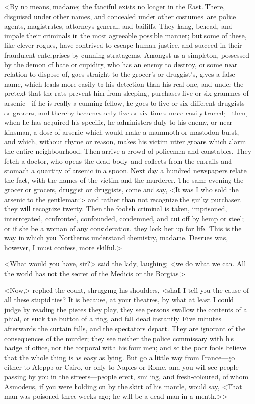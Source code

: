  <By no means, madame; the fanciful exists no longer in the East. There, disguised under other names, and concealed under other costumes, are police agents, magistrates, attorneys-general, and bailiffs. They hang, behead, and impale their criminals in the most agreeable possible manner; but some of these, like clever rogues, have contrived to escape human justice, and succeed in their fraudulent enterprises by cunning stratagems. Amongst us a simpleton, possessed by the demon of hate or cupidity, who has an enemy to destroy, or some near relation to dispose of, goes straight to the grocer's or druggist's, gives a false name, which leads more easily to his detection than his real one, and under the pretext that the rats prevent him from sleeping, purchases five or six grammes of arsenic—if he is really a cunning fellow, he goes to five or six different druggists or grocers, and thereby becomes only five or six times more easily traced;—then, when he has acquired his specific, he administers duly to his enemy, or near kinsman, a dose of arsenic which would make a mammoth or mastodon burst, and which, without rhyme or reason, makes his victim utter groans which alarm the entire neighbourhood. Then arrive a crowd of policemen and constables. They fetch a doctor, who opens the dead body, and collects from the entrails and stomach a quantity of arsenic in a spoon. Next day a hundred newspapers relate the fact, with the names of the victim and the murderer. The same evening the grocer or grocers, druggist or druggists, come and say, <It was I who sold the arsenic to the gentleman;> and rather than not recognize the guilty purchaser, they will recognize twenty. Then the foolish criminal is taken, imprisoned, interrogated, confronted, confounded, condemned, and cut off by hemp or steel; or if she be a woman of any consideration, they lock her up for life. This is the way in which you Northerns understand chemistry, madame. Desrues was, however, I must confess, more skilful.> 

 <What would you have, sir?> said the lady, laughing; <we do what we can. All the world has not the secret of the Medicis or the Borgias.> 

 <Now,> replied the count, shrugging his shoulders, <shall I tell you the cause of all these stupidities? It is because, at your theatres, by what at least I could judge by reading the pieces they play, they see persons swallow the contents of a phial, or suck the button of a ring, and fall dead instantly. Five minutes afterwards the curtain falls, and the spectators depart. They are ignorant of the consequences of the murder; they see neither the police commissary with his badge of office, nor the corporal with his four men; and so the poor fools believe that the whole thing is as easy as lying. But go a little way from France—go either to Aleppo or Cairo, or only to Naples or Rome, and you will see people passing by you in the streets—people erect, smiling, and fresh-coloured, of whom Asmodeus, if you were holding on by the skirt of his mantle, would say, <That man was poisoned three weeks ago; he will be a dead man in a month.>> 

